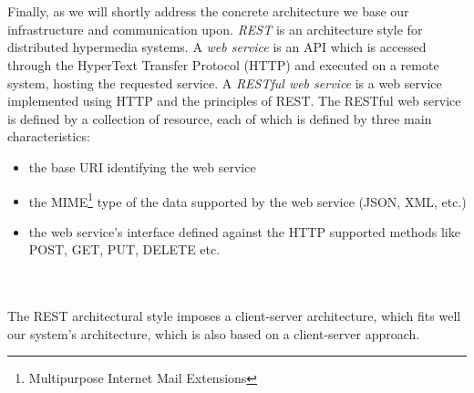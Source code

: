\\\\
Finally, as we will shortly address the concrete architecture we base our infrastructure and communication upon. \emph{REST} is an architecture style for distributed hypermedia systems. A \emph{web service} is an API which is accessed through the HyperText Transfer Protocol (HTTP) and executed on a remote system, hosting the requested service. A \emph{RESTful web service} is a web service implemented using HTTP and the principles of REST. The RESTful web service is defined by a collection of resource, each of which is defined by three main characteristics:
\begin{itemize}
  \item the base URI identifying the web service
  \item the MIME\footnote{Multipurpose Internet Mail Extensions} type of the
  data supported by the web service (JSON, XML, etc.)
  \item the web service's interface defined against the HTTP supported methods
  like POST, GET, PUT, DELETE etc.
\end{itemize}
\\\\
The REST architectural style imposes a client-server architecture, which fits well our system's architecture, which is also based on a client-server approach.

